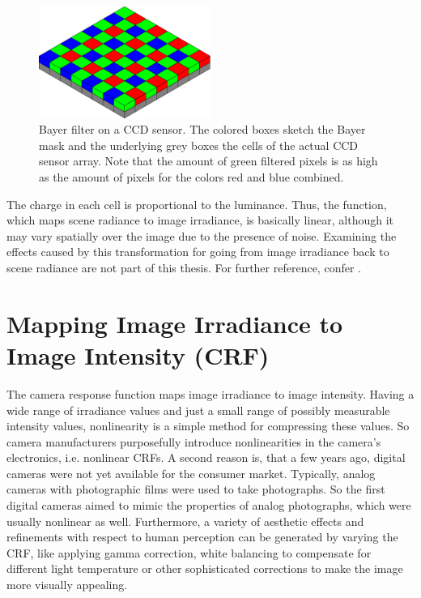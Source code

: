 \begin{figure}[t]
	\centering
	\includegraphics[width=0.5\textwidth]{images/bayerfilter.pdf}
	\caption[Bayer filter on a CCD sensor]{Bayer filter on a CCD sensor. The colored boxes sketch the Bayer mask and the underlying grey boxes the cells of the actual CCD sensor array. Note that the amount of green filtered pixels is as high as the amount of pixels for the colors red and blue combined.}
	\label{fig:bayermask}
\end{figure}

The charge in each cell is proportional to the luminance. Thus, the function, which maps scene radiance to image irradiance, is basically linear, although it may vary spatially over the image due to the presence of noise. Examining the effects caused by this transformation for going from image irradiance back to scene radiance are not part of this thesis. For further reference, confer \cite{healey1994radiometric}.


\section{Mapping Image Irradiance to Image Intensity (CRF)}
\label{sec:irradiancetointensity}
The camera response function maps image irradiance to image intensity. Having a wide range of irradiance values and just a small range of possibly measurable intensity values, nonlinearity is a simple method for compressing these values. So camera manufacturers purposefully introduce nonlinearities in the camera's electronics, \hbox{i.e.} nonlinear CRFs. A second reason is, that a few years ago, digital cameras were not yet available for the consumer market. Typically, analog cameras with photographic films were used to take photographs. So the first digital cameras aimed to mimic the properties of analog photographs, which were usually nonlinear as well. Furthermore, a variety of aesthetic effects and refinements with respect to human perception can be generated by varying the CRF, like applying gamma correction, white balancing to compensate for different light temperature or other sophisticated corrections to make the image more visually appealing.

